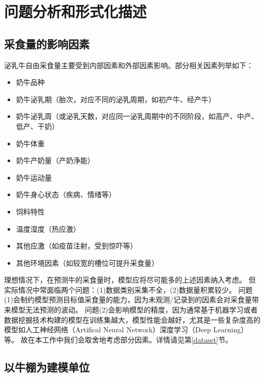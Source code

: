 \section{问题分析和形式化描述}
\label{analyze}

\subsection{采食量的影响因素}

泌乳牛自由采食量主要受到内部因素和外部因素影响。部分相关因素列举如下：


\begin{itemize}
\item
奶牛品种
\item
奶牛泌乳期（胎次，对应不同的泌乳周期，如初产牛、经产牛）
\item
 奶牛泌乳周（或泌乳天数，对应同一泌乳周期中的不同阶段，如高产、中产、低产、干奶）
\item
奶牛体重
\item
奶牛产奶量（产奶浄能）
\item
奶牛运动量
\item
奶牛身心状态（疾病、情绪等）
\end{itemize}

\begin{itemize}
\item
饲料特性
\item
温度湿度（热应激）
\item
其他应激（如疫苗注射，受到惊吓等）
\item
其他环境因素（如较宽的槽位可提升采食量）

\end{itemize}

理想情况下，在预测牛的采食量时，模型应将尽可能多的上述因素纳入考虑。
但实际情况中常面临两个问题：(1)数据类别采集不全，(2)数据量积累较少。
问题(1)会制约模型预测目标值采食量的能力，因为未观测/记录到的因素会对采食量带来模型无法预测的波动。
问题(2)会影响模型的精度，因为通常基于机器学习或者数据挖掘技术构建的模型在训练集越大，模型性能会越好，尤其是一些复杂度高的模型如人工神经网络（Artifical Neural Network）深度学习（Deep Learning）等。
故在本工作中我们会取舍地考虑部分因素。详情请见第\ref{dataset}节。

\subsection{以牛棚为建模单位}

